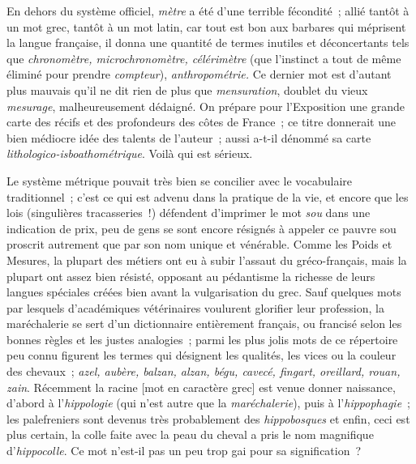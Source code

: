 \documentclass[french,twoside]{book} %
\begin{document}
En dehors du système officiel, {\itshape mètre} a été d’une terrible fécondité ; allié tantôt à un mot grec, tantôt à un mot latin, car tout est bon aux barbares qui méprisent la langue française, il donna une quantité de termes inutiles et déconcertants tels que {\itshape chronomètre, microchronomètre, célérimètre} (que l’instinct a tout de même éliminé pour prendre {\itshape compteur}), {\itshape anthropométrie.} Ce dernier mot est d’autant plus mauvais qu’il ne dit rien de plus que {\itshape mensuration}, doublet du vieux {\itshape mesurage}, malheureusement dédaigné. On prépare pour l’Exposition une grande carte des récifs et des profondeurs des côtes de France ; ce titre donnerait une bien médiocre idée des talents de l’auteur ; aussi a-t-il dénommé sa carte {\itshape lithologico-isboathométrique}. Voilà qui est sérieux.\par
Le système métrique pouvait très bien se concilier avec le vocabulaire traditionnel ; c’est ce qui est advenu dans la pratique de la vie, et encore que les lois (singulières tracasseries !) défendent d’imprimer le mot {\itshape sou} dans une indication de prix, peu de gens se sont encore résignés à appeler ce pauvre sou proscrit autrement que par son nom unique et vénérable. Comme les Poids et Mesures, la plupart des métiers ont eu à subir l’assaut du gréco-français, mais la plupart ont assez bien résisté, opposant au pédantisme la richesse de leurs langues spéciales créées bien avant la vulgarisation du grec. Sauf quelques mots par lesquels d’académiques vétérinaires voulurent glorifier leur profession, la maréchalerie se sert d’un dictionnaire entièrement français, ou francisé selon les bonnes règles et les justes analogies ; parmi les plus jolis mots de ce répertoire peu connu figurent les termes qui désignent les qualités, les vices ou la couleur des chevaux ; {\itshape azel, aubère, balzan, alzan, bégu, cavecé, fingart, oreillard, rouan, zain}. Récemment la racine [mot en caractère grec] est venue donner naissance, d’abord à l’{\itshape hippologie} (qui n’est autre que la {\itshape maréchalerie}), puis à l’{\itshape hippophagie} ; les palefreniers sont devenus très probablement des {\itshape hippobosques} et enfin, ceci est plus certain, la colle faite avec la peau du cheval a pris le nom magnifique d’{\itshape hippocolle}. Ce mot n’est-il pas un peu trop gai pour sa signification ?\par
\end{document}
